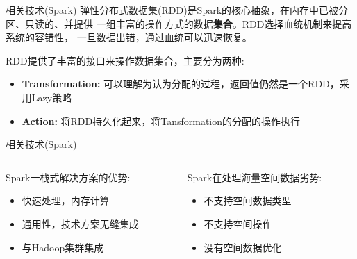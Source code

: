 \begin{frame}[c]{相关技术(Spark)}
    弹性分布式数据集(RDD)是Spark的核心抽象，在内存中已被分区、只读的、并提供
    一组丰富的操作方式的数据\textbf{集合}。RDD选择血统机制来提高系统的容错性，
    一旦数据出错，通过血统可以迅速恢复。

    \vspace{0.5em}
    \pause
    RDD提供了丰富的接口来操作数据集合，主要分为两种:
    \begin{itemize}
        \item \textbf{Transformation:} 可以理解为认为分配的过程，返回值仍然是一个RDD，采用Lazy策略
        \item \textbf{Action:} 将RDD持久化起来，将Tansformation的分配的操作执行
    \end{itemize}

\end{frame}

\begin{frame}[c]{相关技术(Spark)}
    \begin{columns}
        \begin{column}{0.5 \textwidth}
            Spark一栈式解决方案的\alert{优势:}
            
            \vspace{0.5em}
            \begin{itemize}
                \item 快速处理，内存计算
                \item 通用性，技术方案无缝集成
                \item 与Hadoop集群集成
            \end{itemize}
        \end{column}

        \pause
        \begin{column}{0.5 \textwidth}
            Spark在处理海量空间数据\alert{劣势:}

            \vspace{0.5em}
            \begin{itemize}
                \item 不支持空间数据类型
                \item 不支持空间操作
                \item 没有空间数据优化
            \end{itemize}
        \end{column}
    \end{columns}

\end{frame}

